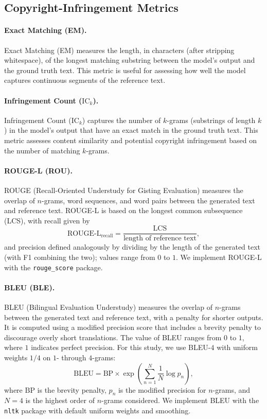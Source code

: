 \subsection{Copyright-Infringement Metrics}
\label{app:cpfuse-reference-metrics}
\label{app:cpfuse-reference-metrics-copy}

\paragraph{Exact Matching (EM).}
Exact Matching (EM) measures the length, in characters (after stripping whitespace), of the longest matching substring between the model's output and the ground truth text. This metric is useful for assessing how well the model captures continuous segments of the reference text.

\paragraph{Infringement Count (\(\mathrm{IC}_k\)).}
Infringement Count (\(\mathrm{IC}_k\)) captures the number of \(k\)-grams (substrings of length \(k\)) in the model's output that have an exact match in the ground truth text. This metric assesses content similarity and potential copyright infringement based on the number of matching \(k\)-grams.

\paragraph{ROUGE-L (ROU).}
ROUGE (Recall-Oriented Understudy for Gisting Evaluation) measures the overlap of \(n\)-grams, word sequences, and word pairs between the generated text and reference text. ROUGE-L is based on the longest common subsequence (LCS), with recall given by
\[
\text{ROUGE-L}_{\text{recall}} = \frac{\text{LCS}}{\text{length of reference text}},
\]
and precision defined analogously by dividing by the length of the generated text (with F1 combining the two); values range from \(0\) to \(1\). We implement ROUGE-L with the \texttt{rouge\_score} package.

\paragraph{BLEU (BLE).}
BLEU (Bilingual Evaluation Understudy) measures the overlap of \(n\)-grams between the generated text and reference text, with a penalty for shorter outputs. It is computed using a modified precision score that includes a brevity penalty to discourage overly short translations. The value of BLEU ranges from \(0\) to \(1\), where \(1\) indicates perfect precision. For this study, we use BLEU-\(4\) with uniform weights \(1/4\) on \(1\)- through \(4\)-grams:
\[
\text{BLEU} = \text{BP} \times \exp\left( \sum_{n=1}^{N} \frac{1}{N} \log p_n \right),
\]
where \(\text{BP}\) is the brevity penalty, \(p_n\) is the modified precision for \(n\)-grams, and \(N = 4\) is the highest order of \(n\)-grams considered. We implement BLEU with the \texttt{nltk} package with default uniform weights and smoothing.

